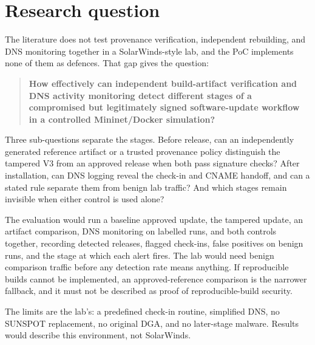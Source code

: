 \section{Research question}
\label{sec:question}

The literature does not test provenance verification, independent rebuilding, and DNS monitoring together in a SolarWinds-style lab, and the PoC implements none of them as defences. That gap gives the question:

\begin{quote}
\textbf{How effectively can independent build-artifact verification and DNS activity monitoring detect different stages of a compromised but legitimately signed software-update workflow in a controlled Mininet/Docker simulation?}
\end{quote}

Three sub-questions separate the stages. Before release, can an independently generated reference artifact or a trusted provenance policy distinguish the tampered V3 from an approved release when both pass signature checks? After installation, can DNS logging reveal the check-in and CNAME handoff, and can a stated rule separate them from benign lab traffic? And which stages remain invisible when either control is used alone?

The evaluation would run a baseline approved update, the tampered update, an artifact comparison, DNS monitoring on labelled runs, and both controls together, recording detected releases, flagged check-ins, false positives on benign runs, and the stage at which each alert fires. The lab would need benign comparison traffic before any detection rate means anything. If reproducible builds cannot be implemented, an approved-reference comparison is the narrower fallback, and it must not be described as proof of reproducible-build security.

The limits are the lab's: a predefined check-in routine, simplified DNS, no SUNSPOT replacement, no original DGA, and no later-stage malware. Results would describe this environment, not SolarWinds.
